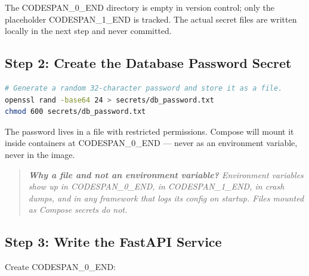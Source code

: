\documentclass[11pt,a4paper]{book}
\begin{document}
The CODESPAN\_0\_END directory is empty in version control; only the placeholder CODESPAN\_1\_END is tracked. The actual secret files are written locally in the next step and never committed.

\medskip

\subsection{Step 2: Create the Database Password Secret}

\begin{lstlisting}[language=Bash]
# Generate a random 32-character password and store it as a file.
openssl rand -base64 24 > secrets/db_password.txt
chmod 600 secrets/db_password.txt
\end{lstlisting}

The password lives in a file with restricted permissions. Compose will mount it inside containers at CODESPAN\_0\_END --- never as an environment variable, never in the image.

\begin{quote}
\textit{\textbf{Why a file and not an environment variable?} Environment variables show up in CODESPAN\_0\_END, in CODESPAN\_1\_END, in crash dumps, and in any framework that logs its config on startup. Files mounted as Compose secrets do not.}
\end{quote}

\medskip

\subsection{Step 3: Write the FastAPI Service}

Create CODESPAN\_0\_END:
\end{document}
